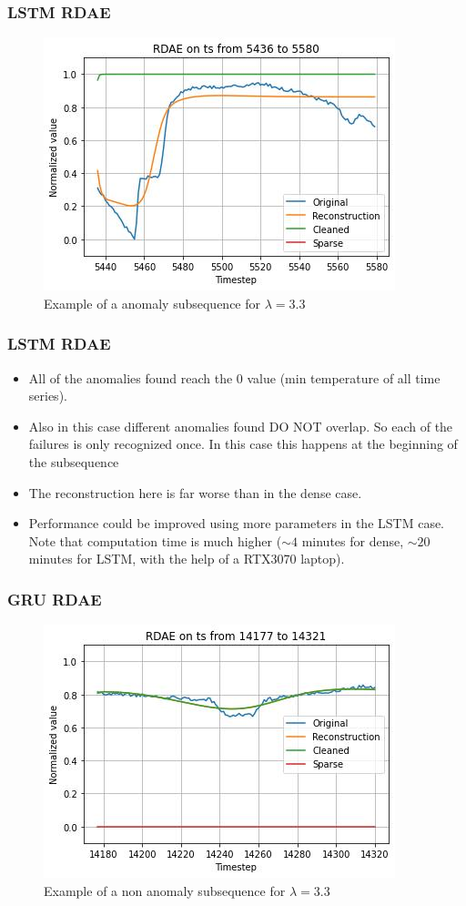 \documentclass{beamer}
\theoremstyle{plain}
\theoremstyle{definition}
\theoremstyle{remark}
\begin{document}
\begin{frame}
	\frametitle{LSTM RDAE}
	\begin{figure}
		\centering
		\includegraphics[width=0.7\linewidth]{Images/LSTMlam3.3ts_anomalyzoom5436.jpg}
		\caption[]{Example of a anomaly subsequence for $\lambda=3.3$}
	\end{figure}
\end{frame}

\begin{frame}
	\frametitle{LSTM RDAE}
	\begin{itemize}
		\item All of the anomalies found reach the $0$ value (min temperature of all time series).
		\item Also in this case different anomalies found DO NOT overlap. So each of the failures is only recognized once. In this case this happens at the beginning of the subsequence
		\item The reconstruction here is far worse than in the dense case.
		\item Performance could be improved using more parameters in the LSTM case. Note that computation time is much higher ($\sim 4$ minutes for dense, $\sim 20$ minutes for LSTM, with the help of a RTX3070 laptop).
	\end{itemize}
\end{frame}

\begin{frame}
	\frametitle{GRU RDAE}
	\begin{figure}
		\centering
		\includegraphics[width=0.7\linewidth]{Images/GRUlam3.3ts_non_anomalyzoom14177.jpg}
		\caption[]{Example of a non anomaly subsequence for $\lambda=3.3$}
	\end{figure}
\end{frame}
\end{document}

